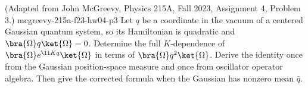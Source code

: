 \begin{enumerate}
  {(Adapted from John McGreevy, Physics 215A, Fall 2023, Assignment 4, Problem 3.)}
  {mcgreevy-215a-f23-hw04-p3}
Let \(q\) be a coordinate in the vacuum of a centered Gaussian quantum
system, so its Hamiltonian is quadratic and
\(\bra{\Omega}q\ket{\Omega}=0\).  Determine the full \(K\)-dependence of
\(\bra{\Omega}e^{\ii Kq}\ket{\Omega}\) in terms of
\(\bra{\Omega}q^2\ket{\Omega}\).  Derive the identity once from the
Gaussian position-space measure and once from oscillator operator algebra.
Then give the corrected formula when the Gaussian has nonzero mean
\(\bar q\).
\end{enumerate}
